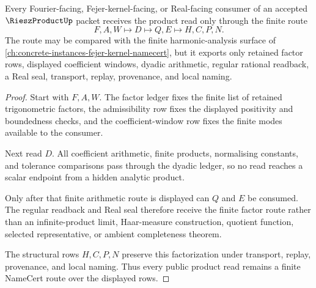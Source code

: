 \begin{theorem}
\label{thm:riesz-product-finite-factor-route}
Every Fourier-facing, Fejer-kernel-facing, or Real-facing consumer of an accepted $\RieszProductUp$ packet receives the product read only through the finite route
$$
F,A,W
\longmapsto
D
\longmapsto
Q,E
\longmapsto
H,C,P,N .
$$
The route may be compared with the finite harmonic-analysis surface of \autoref{ch:concrete-instances-fejer-kernel-namecert}, but it exports only retained factor rows, displayed coefficient windows, dyadic arithmetic, regular rational readback, a Real seal, transport, replay, provenance, and local naming.
\end{theorem}
\begin{proof}
Start with $F,A,W$. The factor ledger fixes the finite list of retained trigonometric factors, the admissibility row fixes the displayed positivity and boundedness checks, and the coefficient-window row fixes the finite modes available to the consumer.

Next read $D$. All coefficient arithmetic, finite products, normalising constants, and tolerance comparisons pass through the dyadic ledger, so no read reaches a scalar endpoint from a hidden analytic product.

Only after that finite arithmetic route is displayed can $Q$ and $E$ be consumed. The regular readback and Real seal therefore receive the finite factor route rather than an infinite-product limit, Haar-measure construction, quotient function, selected representative, or ambient completeness theorem.

The structural rows $H,C,P,N$ preserve this factorization under transport, replay, provenance, and local naming. Thus every public product read remains a finite NameCert route over the displayed rows.
\end{proof}



